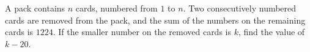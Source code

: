 A pack contains $n$ cards, numbered from $1$ to $n$. Two consecutively numbered cards are removed from the pack, and the sum of the numbers on the remaining cards is $1224$. If the smaller number on the removed cards is $k$, find the value of $k-20$.
